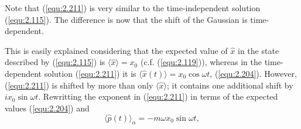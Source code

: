 Note that (\ref{equ:2.211}) is very similar to the
time-independent solution (\ref{equ:2.115}). The difference
is now that the shift of the Gaussian is time-dependent.

This is easily explained considering that the expected value
of $\hat{x}$ in the state described by (\ref{equ:2.115}) is
$\langle \hat{x} \rangle = x_0$ (c.f. (\ref{equ:2.119})),
whereas in the time-dependent solution (\ref{equ:2.211}) it
is $\langle \hat{x}(t) \rangle = x_0 \cos \omega t$,
(\ref{equ:2.204}). However, (\ref{equ:2.211}) is shifted by
more than only $\langle \hat{x} \rangle$; it contains one
additional shift by $i x_0 \sin \omega t$. Rewritting the
exponent in (\ref{equ:2.211}) in terms of the expected values
(\ref{equ:2.204}) and
\begin{equation}
  \langle \hat{p}(t) \rangle_{\alpha} = - m\omega x_0 \sin
  \omega t,
  \label{equ:2.212}
\end{equation}
